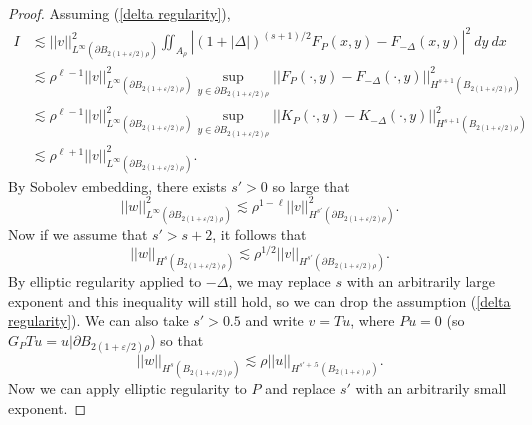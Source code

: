 \documentclass[reqno,12pt,letterpaper]{amsart}
\theoremstyle{definition}
\numberwithin{equation}{section}
\begin{document}
\begin{proof}
Assuming (\ref{delta regularity}),
\begin{align*}
I &\lesssim ||v||_{L^\infty(\partial B_{2(1 + \varepsilon/2)\rho})}^2 \iint_{A_\rho} |(1 + |\Delta|)^{(s+1)/2} F_P(x, y) - F_{-\Delta}(x, y)|^2 ~dy ~dx\\
&\lesssim \rho^{\ell - 1} ||v||_{L^\infty(\partial B_{2(1 + \varepsilon/2)\rho})}^2 \sup_{y \in \partial B_{2(1 + \varepsilon/2)\rho}} ||F_P(\cdot, y) - F_{-\Delta}(\cdot, y)||_{H^{s + 1}(B_{2(1 + \varepsilon/2)\rho})}^2\\
&\lesssim \rho^{\ell - 1} ||v||_{L^\infty(\partial B_{2(1 + \varepsilon/2)\rho})}^2 \sup_{y \in \partial B_{2(1 + \varepsilon/2)\rho}} ||K_P(\cdot, y) - K_{-\Delta}(\cdot, y)||_{H^{s + 1}(B_{2(1 + \varepsilon/2)\rho})}^2\\
&\lesssim \rho^{\ell + 1} ||v||_{L^\infty(\partial B_{2(1 + \varepsilon/2)\rho})}^2.
\end{align*}
By Sobolev embedding, there exists $s' > 0$ so large that
$$||w||_{L^\infty(\partial B_{2(1 + \varepsilon/2)\rho})}^2 \lesssim \rho^{1-\ell} ||v||_{H^{s'}(\partial B_{2(1 + \varepsilon/2)\rho})}^2.$$
Now if we assume that $s' > s + 2$, it follows that
$$||w||_{H^s(B_{2(1 + \varepsilon/2)\rho})} \lesssim \rho^{1/2} ||v||_{H^{s'}(\partial B_{2(1 + \varepsilon/2)\rho})}.$$
By elliptic regularity applied to $-\Delta$, we may replace $s$ with an arbitrarily large exponent and this inequality will still hold, so we can drop the assumption (\ref{delta regularity}).
We can also take $s' > 0.5$ and write $v = Tu$, where $Pu = 0$ (so $G_PTu = u|\partial B_{2(1 + \varepsilon/2)\rho}$) so that
$$||w||_{H^s(B_{2(1 + \varepsilon/2)\rho})} \lesssim \rho ||u||_{H^{s' + .5}(B_{2(1 + \varepsilon)\rho})}.$$
Now we can apply elliptic regularity to $P$ and replace $s'$ with an arbitrarily small exponent.
\end{proof}
\end{document}
